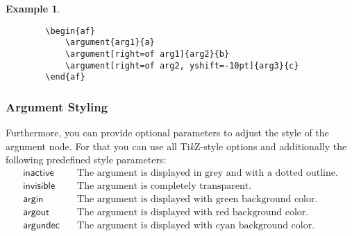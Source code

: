 \documentclass{article}
\newcommand{\tikzname}{Ti\emph{k}Z\xspace}
\newtheorem{example}{Example}
\begin{document}
    \begin{example}~

    \begin{verbatim}
        \begin{af}
            \argument{arg1}{a}
            \argument[right=of arg1]{arg2}{b}
            \argument[right=of arg2, yshift=-10pt]{arg3}{c}
        \end{af}
    \end{verbatim}

    \begin{center}
        \begin{af}
        \end{af}
    \end{center}
        
    \end{example}

\subsubsection{Argument Styling}
    Furthermore, you can provide optional parameters to adjust the style of the argument node.
    For that you can use all \tikzname-style options and additionally the following predefined style parameters:
    \begin{align*}
        \mathsf{inactive} &\quad \text{The argument is displayed in grey and with a dotted outline.}\\
        \mathsf{invisible} &\quad \text{The argument is completely transparent.}\\
        \mathsf{argin} &\quad \text{The argument is displayed with green background color.}\\
        \mathsf{argout} &\quad \text{The argument is displayed with red background color.}\\
        \mathsf{argundec} &\quad \text{The argument is displayed with cyan background color.}\\
    \end{align*}
\end{document}
